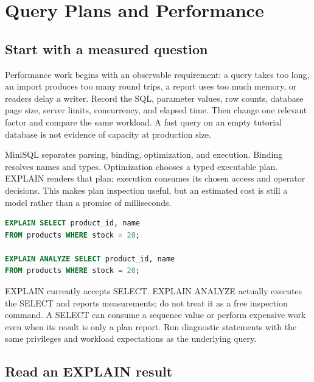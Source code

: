 \chapter{Query Plans and Performance}
\label{adv:performance}

\section{Start with a measured question}

Performance work begins with an observable requirement: a query takes too long, an import produces too many round trips, a report uses too much memory, or readers delay a writer. Record the SQL, parameter values, row counts, database page size, server limits, concurrency, and elapsed time. Then change one relevant factor and compare the same workload. A fast query on an empty tutorial database is not evidence of capacity at production size.

MiniSQL separates parsing, binding, optimization, and execution. Binding resolves names and types. Optimization chooses a typed executable plan. EXPLAIN renders that plan; execution consumes its chosen access and operator decisions. This makes plan inspection useful, but an estimated cost is still a model rather than a promise of milliseconds.

\begin{lstlisting}[language=SQL]
EXPLAIN SELECT product_id, name
FROM products WHERE stock = 20;

EXPLAIN ANALYZE SELECT product_id, name
FROM products WHERE stock = 20;
\end{lstlisting}

EXPLAIN currently accepts SELECT. EXPLAIN ANALYZE actually executes the SELECT and reports measurements; do not treat it as a free inspection command. A SELECT can consume a sequence value or perform expensive work even when its result is only a plan report. Run diagnostic statements with the same privileges and workload expectations as the underlying query.


\section{Read an EXPLAIN result}

